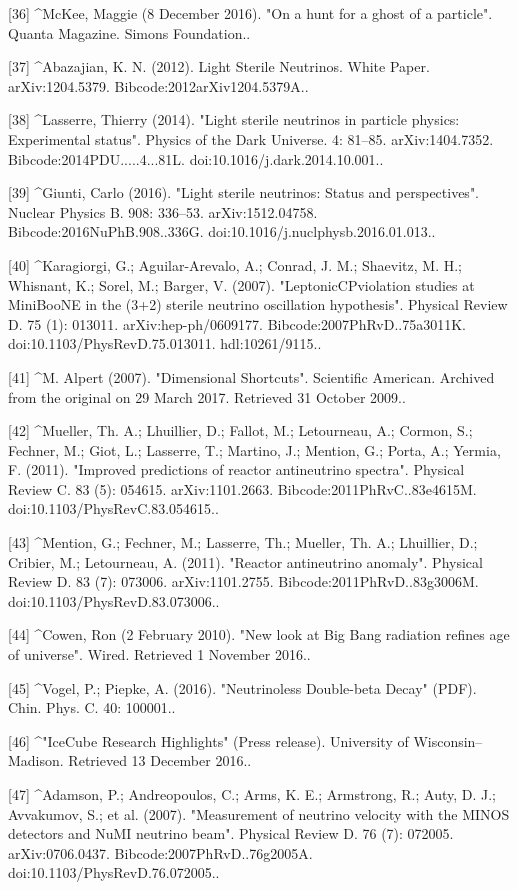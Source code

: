 [36]
^McKee, Maggie (8 December 2016). "On a hunt for a ghost of a particle". Quanta Magazine. Simons Foundation..

[37]
^Abazajian, K. N. (2012). Light Sterile Neutrinos. White Paper. arXiv:1204.5379. Bibcode:2012arXiv1204.5379A..

[38]
^Lasserre, Thierry (2014). "Light sterile neutrinos in particle physics: Experimental status". Physics of the Dark Universe. 4: 81–85. arXiv:1404.7352. Bibcode:2014PDU.....4...81L. doi:10.1016/j.dark.2014.10.001..

[39]
^Giunti, Carlo (2016). "Light sterile neutrinos: Status and perspectives". Nuclear Physics B. 908: 336–53. arXiv:1512.04758. Bibcode:2016NuPhB.908..336G. doi:10.1016/j.nuclphysb.2016.01.013..

[40]
^Karagiorgi, G.; Aguilar-Arevalo, A.; Conrad, J. M.; Shaevitz, M. H.; Whisnant, K.; Sorel, M.; Barger, V. (2007). "LeptonicCPviolation studies at MiniBooNE in the (3+2) sterile neutrino oscillation hypothesis". Physical Review D. 75 (1): 013011. arXiv:hep-ph/0609177. Bibcode:2007PhRvD..75a3011K. doi:10.1103/PhysRevD.75.013011. hdl:10261/9115..

[41]
^M. Alpert (2007). "Dimensional Shortcuts". Scientific American. Archived from the original on 29 March 2017. Retrieved 31 October 2009..

[42]
^Mueller, Th. A.; Lhuillier, D.; Fallot, M.; Letourneau, A.; Cormon, S.; Fechner, M.; Giot, L.; Lasserre, T.; Martino, J.; Mention, G.; Porta, A.; Yermia, F. (2011). "Improved predictions of reactor antineutrino spectra". Physical Review C. 83 (5): 054615. arXiv:1101.2663. Bibcode:2011PhRvC..83e4615M. doi:10.1103/PhysRevC.83.054615..

[43]
^Mention, G.; Fechner, M.; Lasserre, Th.; Mueller, Th. A.; Lhuillier, D.; Cribier, M.; Letourneau, A. (2011). "Reactor antineutrino anomaly". Physical Review D. 83 (7): 073006. arXiv:1101.2755. Bibcode:2011PhRvD..83g3006M. doi:10.1103/PhysRevD.83.073006..

[44]
^Cowen, Ron (2 February 2010). "New look at Big Bang radiation refines age of universe". Wired. Retrieved 1 November 2016..

[45]
^Vogel, P.; Piepke, A. (2016). "Neutrinoless Double-beta Decay" (PDF). Chin. Phys. C. 40: 100001..

[46]
^"IceCube Research Highlights" (Press release). University of Wisconsin–Madison. Retrieved 13 December 2016..

[47]
^Adamson, P.; Andreopoulos, C.; Arms, K. E.; Armstrong, R.; Auty, D. J.; Avvakumov, S.; et al. (2007). "Measurement of neutrino velocity with the MINOS detectors and NuMI neutrino beam". Physical Review D. 76 (7): 072005. arXiv:0706.0437. Bibcode:2007PhRvD..76g2005A. doi:10.1103/PhysRevD.76.072005..

